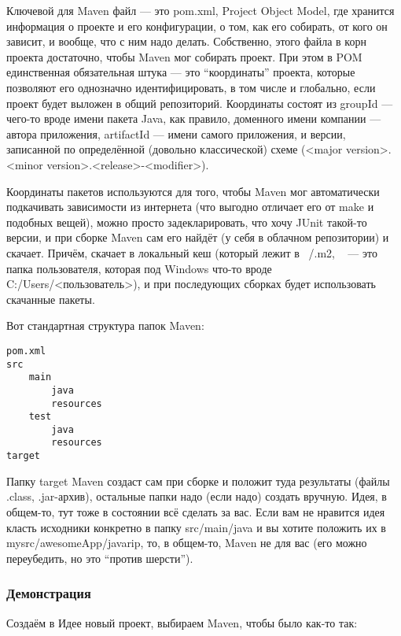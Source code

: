 \documentclass[a5paper]{article}
\begin{document}
Ключевой для Maven файл --- это pom.xml, Project Object Model, где хранится информация о проекте и его конфигурации, о том, как его собирать, от кого он зависит, и вообще, что с ним надо делать. Собственно, этого файла в корн проекта достаточно, чтобы Maven мог собирать проект. При этом в POM единственная обязательная штука --- это ``координаты'' проекта, которые позволяют его однозначно идентифицировать, в том числе и глобально, если проект будет выложен в общий репозиторий. Координаты состоят из groupId --- чего-то вроде имени пакета Java, как правило, доменного имени компании --- автора приложения, artifactId --- имени самого приложения, и версии, записанной по определённой (довольно классической) схеме (<major version>.<minor version>.<release>-<modifier>).

Координаты пакетов используются для того, чтобы Maven мог автоматически подкачивать зависимости из интернета (что выгодно отличает его от make и подобных вещей), можно просто задекларировать, что хочу JUnit такой-то версии, и при сборке Maven сам его найдёт (у себя в облачном репозитории) и скачает. Причём, скачает в локальный кеш (который лежит в ~/.m2, ~ --- это папка пользователя, которая под Windows что-то вроде  C:/Users/<пользователь>), и при последующих сборках будет использовать скачанные пакеты.

Вот стандартная структура папок Maven:

\begin{verbatim}
pom.xml
src
    main
        java
        resources
    test
        java
        resources
target
\end{verbatim}

Папку target Maven создаст сам при сборке и положит туда результаты (файлы .class, .jar-архив), остальные папки надо (если надо) создать вручную. Идея, в общем-то, тут тоже в состоянии всё сделать за вас. Если вам не нравится идея класть исходники конкретно в папку src/main/java и вы хотите положить их в mysrc/awesomeApp/javarip, то, в общем-то, Maven не для вас (его можно переубедить, но это ``против шерсти'').

\subsubsection{Демонстрация}

Создаём в Идее новый проект, выбираем Maven, чтобы было как-то так:
\end{document}
